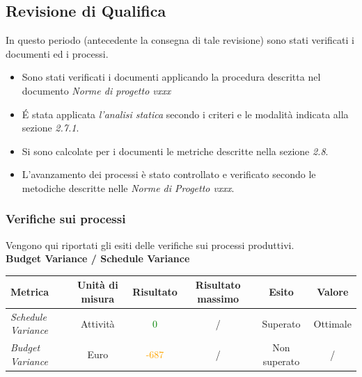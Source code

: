 {  
  
  \subsection{Revisione di Qualifica}
  
    In questo periodo (antecedente la consegna di tale revisione) sono stati verificati i documenti ed i processi.
    
    \begin{itemize}
    	\item Sono stati verificati i documenti applicando la procedura descritta nel documento \emph{Norme di progetto vxxx}
    	\item \'E stata applicata \emph{l'analisi statica} secondo i criteri e le modalità indicata alla sezione \emph{2.7.1}.
    	\item Si sono calcolate per i documenti le metriche descritte nella sezione \emph{2.8}.
   
    	\item L’avanzamento dei processi è stato controllato e verificato secondo le metodiche descritte nelle \emph{Norme di Progetto vxxx}.
    	
    \end{itemize}
    \subsubsection{Verifiche sui processi}
    
    Vengono qui riportati gli esiti delle verifiche sui processi produttivi.\\
    
    
    \textbf{Budget Variance / Schedule Variance}
     \begin{longtable}{|>{\centering}m{2cm}|c|c|c|c|c|}
     	\hline
     	\textbf{Metrica} & \textbf{Unità di misura} & \textbf{Risultato} & \textbf{Risultato massimo} & \textbf{Esito} & \textbf{Valore}\\
     	\hline
     	\endhead
     	\emph{Schedule Variance} & {Attività} & \textcolor{Green}{0} & / & Superato & Ottimale\\ \hline
     	\emph{Budget Variance} & {Euro} & \textcolor{Orange}{-687} & / & Non superato & /\\ \hline
    

\end{longtable}}
